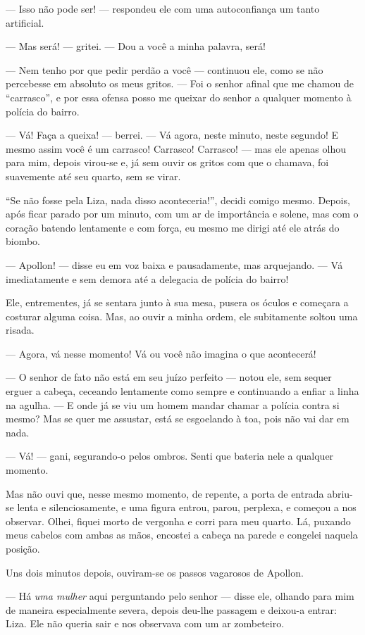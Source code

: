--- Isso não pode ser! --- respondeu ele com uma autoconfiança um tanto
artificial.

--- Mas será! --- gritei. --- Dou a você a minha palavra, será!

--- Nem tenho por que pedir perdão a você --- continuou ele, como se não
percebesse em absoluto os meus gritos. --- Foi o senhor afinal que me
chamou de “carrasco”, e por essa ofensa posso me queixar do senhor a
qualquer momento à polícia do bairro.

--- Vá! Faça a queixa! --- berrei. --- Vá agora, neste minuto, neste segundo!
E mesmo assim você é um carrasco! Carrasco! Carrasco! --- mas ele apenas
olhou para mim, depois virou-se e, já sem ouvir os gritos com que o
chamava, foi suavemente até seu quarto, sem se virar.

“Se não fosse pela Liza, nada disso aconteceria!”, decidi comigo mesmo.
Depois, após ficar parado por um minuto, com um ar de importância e
solene, mas com o coração batendo lentamente e com força, eu mesmo me
dirigi até ele atrás do biombo.

--- Apollon! --- disse eu em voz baixa e pausadamente, mas arquejando. --- Vá
imediatamente e sem demora até a delegacia de polícia do bairro!

Ele, entrementes, já se sentara junto à sua mesa, pusera os óculos e
começara a costurar alguma coisa. Mas, ao ouvir a minha ordem, ele
subitamente soltou uma risada.

--- Agora, vá nesse momento! Vá ou você não imagina o que acontecerá!

--- O senhor de fato não está em seu juízo perfeito --- notou ele, sem
sequer erguer a cabeça, ceceando lentamente como sempre e continuando a
enfiar a linha na agulha. --- E onde já se viu um homem mandar chamar a
polícia contra si mesmo? Mas se quer me assustar, está se esgoelando à
toa, pois não vai dar em nada.

--- Vá! --- gani, segurando-o pelos ombros. Senti que bateria nele a
qualquer momento.

Mas não ouvi que, nesse mesmo momento, de repente, a porta de entrada
abriu-se lenta e silenciosamente, e uma figura entrou, parou, perplexa,
e começou a nos observar. Olhei, fiquei morto de vergonha e corri para
meu quarto. Lá, puxando meus cabelos com ambas as mãos, encostei a
cabeça na parede e congelei naquela posição.

Uns dois minutos depois, ouviram-se os passos vagarosos de Apollon.

--- Há \textit{uma mulher} aqui perguntando pelo
senhor --- disse ele, olhando para mim de maneira especialmente severa,
depois deu-lhe passagem e deixou-a entrar: Liza. Ele não queria sair e
nos observava com um ar zombeteiro.

